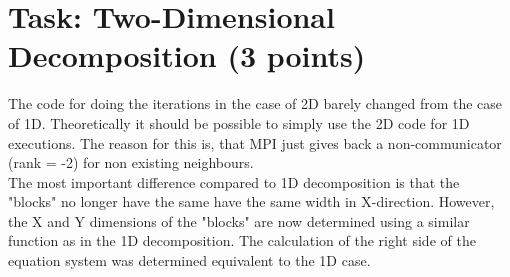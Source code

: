 \documentclass[10pt,a4paper]{article}
\begin{document}
\section{Task: Two-Dimensional Decomposition (3 points)}

The code for doing the iterations in the case of 2D barely changed from the case of 1D. Theoretically it 
should be possible to simply use the 2D code for 1D executions. The reason for this is, that MPI just 
gives back a non-communicator (rank = -2) for non existing neighbours.
\\
The most important difference compared to 1D decomposition is that the "blocks" no longer have the same
have the same width in X-direction. However, the X and Y dimensions of the "blocks" are now 
determined using a similar function as in the 1D decomposition. The calculation of the right 
side of the equation system was determined equivalent to the 1D case.
\end{document}
